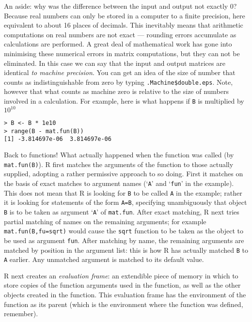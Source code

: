 \documentclass[10pt] {article}
\theoremstyle{definition}
\begin{document}
An aside:  why was the difference between the input and output not exactly 0? Because real numbers can only be stored in a computer to a finite precision, here equivalent to about 16 places of decimals. This inevitably means that arithmetic computations on real numbers are not exact --- rounding errors accumulate as calculations are performed.  A great deal of mathematical work has gone into minimising these numerical errors in matrix computations, but they can not be eliminated.  In this case we can say that the input and output matrices are identical {\em to machine precision}. You can get an idea of the size of number that counts as indistinguishable from zero by typing \lstinline+.Machine$double.eps+. Note, however that what counts as machine zero is relative to the size of numbers involved in a calculation. For example, here is what happens if {\tt B} is multiplied by $10^{10}$
\begin{lstlisting}
> B <- B * 1e10
> range(B - mat.fun(B))
[1] -3.814697e-06  3.814697e-06
\end{lstlisting}

Back to functions! What actually happened when the function was called (by \lstinline+mat.fun(B)+). R first matches the arguments of the function to those actually supplied, adopting a rather permissive approach to so doing. First it matches on the basis of exact matches to argument names (`{\lstinline+A+}' and `{\lstinline+fun+}' in the example). This does not mean that R is looking for {\lstinline+B+} to be called {\lstinline+A+} in the example; rather it is looking for statements of the form \lstinline+A=B+, specifying unambiguously that object {\lstinline+B+} is to be taken as argument `{\lstinline+A+}' of {\lstinline+mat.fun+}. After exact matching, R next tries partial matching of names on the remaining arguments; for example \lstinline+mat.fun(B,fu=sqrt)+ would cause the {\lstinline+sqrt+} function to be taken as the object to be used as argument {\lstinline+fun+}. After matching by name, the remaining arguments are matched by position in the argument list: this is how R has actually matched {\lstinline+B+} to {\lstinline+A+} earlier. Any unmatched argument is matched to its default value. 

R next creates an {\em evaluation frame}: an extendible piece of memory in which to store copies of the function arguments used in the function, as well as the other objects created in the function. This evaluation frame has the environment of the function as its parent (which is the environment where the function was defined, remember). 
\end{document}
